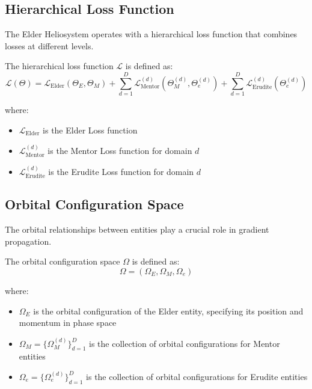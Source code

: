 \subsection{Hierarchical Loss Function}

The Elder Heliosystem operates with a hierarchical loss function that combines losses at different levels.

\begin{definition}
The hierarchical loss function $\mathcal{L}$ is defined as:
\begin{equation}
\mathcal{L}(\Theta) = \mathcal{L}_{\text{Elder}}(\Theta_E, \Theta_M) + \sum_{d=1}^D \mathcal{L}_{\text{Mentor}}^{(d)}(\Theta_M^{(d)}, \Theta_e^{(d)}) + \sum_{d=1}^D \mathcal{L}_{\text{Erudite}}^{(d)}(\Theta_e^{(d)})
\end{equation}

where:
\begin{itemize}
    \item $\mathcal{L}_{\text{Elder}}$ is the Elder Loss function
    \item $\mathcal{L}_{\text{Mentor}}^{(d)}$ is the Mentor Loss function for domain $d$
    \item $\mathcal{L}_{\text{Erudite}}^{(d)}$ is the Erudite Loss function for domain $d$
\end{itemize}
\end{definition}

\subsection{Orbital Configuration Space}

The orbital relationships between entities play a crucial role in gradient propagation.

\begin{definition}
The orbital configuration space $\Omega$ is defined as:
\begin{equation}
\Omega = (\Omega_E, \Omega_M, \Omega_e)
\end{equation}

where:
\begin{itemize}
    \item $\Omega_E$ is the orbital configuration of the Elder entity, specifying its position and momentum in phase space
    \item $\Omega_M = \{\Omega_M^{(d)}\}_{d=1}^D$ is the collection of orbital configurations for Mentor entities
    \item $\Omega_e = \{\Omega_e^{(d)}\}_{d=1}^D$ is the collection of orbital configurations for Erudite entities
\end{itemize}
\end{definition}

